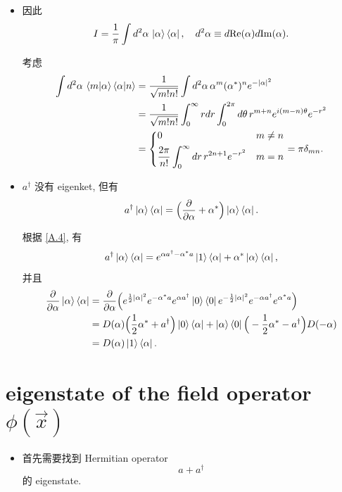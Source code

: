 \documentclass[10pt, a4paper]{article}
\numberwithin{equation}{section}
\begin{document}
\begin{itemize}
		\item 因此
		\begin{equation}
			I = \frac{1}{\pi} \int d^2 \alpha \, \ket{\alpha} \bra{\alpha}, \quad d^2 \alpha \equiv d\mathrm{Re}(\alpha) d\mathrm{Im}(\alpha).
		\end{equation}
		
		\begin{tcolorbox}[title=proof:]
			考虑
			\begin{align}
				\int d^2 \alpha \, \braket{m | \alpha} \braket{\alpha | n} &= \frac{1}{\sqrt{m! n!}} \int d^2 \alpha \, \alpha^m (\alpha^*)^n e^{- |\alpha|^2} \notag \\
				&= \frac{1}{\sqrt{m! n!}} \int_0^\infty r dr \int_0^{2 \pi} d\theta \, r^{m + n} e^{i (m - n) \theta} e^{- r^2} \notag \\
				&= \begin{dcases}
					0 & m \neq n \\
					\frac{2 \pi}{n!} \int_0^\infty dr \, r^{2 n + 1} e^{- r^2} & m = n
				\end{dcases} = \pi \delta_{m n}.
			\end{align}
		\end{tcolorbox}
		
		\item $a^\dag$ 没有 eigenket, 但有
		\begin{equation}
			a^\dag \ket{\alpha} \bra{\alpha} = \Big( \frac{\partial}{\partial \alpha} + \alpha^* \Big) \ket{\alpha} \bra{\alpha}.
		\end{equation}
		
		\begin{tcolorbox}[title=proof:]
			根据 \eqref{A.4}, 有
			\begin{equation}
				a^\dag \ket{\alpha} \bra{\alpha} = e^{\alpha a^\dag - \alpha^* a} \ket{1} \bra{\alpha} + \alpha^* \ket{\alpha} \bra{\alpha},
			\end{equation}
			并且
			\begin{align}
				\frac{\partial}{\partial \alpha} \ket{\alpha} \bra{\alpha} &= \frac{\partial}{\partial \alpha} \Big( e^{\frac{1}{2} |\alpha|^2} e^{- \alpha^* a} e^{\alpha a^\dag} \ket{0} \bra{0} e^{- \frac{1}{2} |\alpha|^2} e^{- \alpha a^\dag} e^{\alpha^* a} \Big) \notag \\
				&= D(\alpha) \Big( \frac{1}{2} \alpha^* + a^\dag \Big) \ket{0} \bra{\alpha} + \ket{\alpha} \bra{0} \Big( - \frac{1}{2} \alpha^* - a^\dag \Big) D(- \alpha) \notag \\
				&= D(\alpha) \ket{1} \bra{\alpha}.
			\end{align}
		\end{tcolorbox}
	\end{itemize}
	
	\section{eigenstate of the field operator \texorpdfstring{$\phi(\vec{x})$}{phi(x)}}
	\begin{itemize}
		\item 首先需要找到 Hermitian operator
		\begin{equation}
			a + a^\dag
		\end{equation}
		的 eigenstate.
	\end{itemize}
\end{document}
